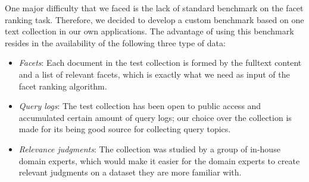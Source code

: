 
One major difficulty that we faced is the lack of standard benchmark on the
facet ranking task.  Therefore, we decided to develop a custom benchmark based
on one text collection in our own applications.  The advantage of using this
benchmark resides in the availability of the following three type of data:
\begin{itemize} \item \emph{Facets}: Each document in the test collection is
formed by the fulltext content and a list of relevant facets, which is exactly
what we need as input of the facet ranking algorithm.  \item \emph{Query logs}:
The test collection has been open to public access and accumulated certain
amount of query logs; our choice over the collection is made for its being good source for collecting query topics.
\item \emph{Relevance judgments}: The collection was studied by a group of
in-house domain experts, which would make it easier for the domain experts to create
relevant judgments on a dataset they are more familiar with.  \end{itemize}

